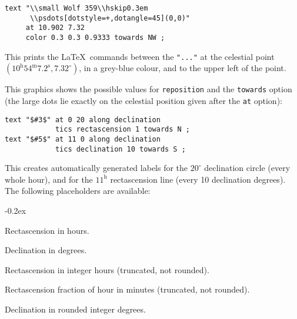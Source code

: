 \documentclass{article}
\newcommand{\subsubskip}{\bigskip}
\begin{document}
\begin{multicols*}{3}
\begin{lstlisting}[showstringspaces=false]
text "\\small Wolf 359\\hskip0.3em
      \\psdots[dotstyle=+,dotangle=45](0,0)"
     at 10.902 7.32
     color 0.3 0.3 0.9333 towards NW ;
\end{lstlisting}
This prints the \LaTeX\ commands between the \verb|"..."| at the celestial
point $(10^{\mathrm h}54^{\mathrm m}7.2^{\mathrm s},7.32^\circ)$, in a
grey-blue colour, and to the upper left of the point.

This graphics shows the possible values for \lstinline{reposition} and the
\lstinline{towards} option (the large dots lie exactly on the celestial
position given after the \lstinline{at} option):\\[1.5ex]
\subsubskip

\begin{lstlisting}
text "$#3$" at 0 20 along declination
            tics rectascension 1 towards N ;
text "$#5$" at 11 0 along declination
            tics declination 10 towards S ;
\end{lstlisting}
This creates automatically generated labels for the $20^\circ$ declination
circle (every whole hour), and for the $11^{\mathrm h}$ rectascension line
(every 10 declination degrees).  The following placeholders are
available:\vspace{-1.5ex}
\begin{description}\itemsep-0.2ex
\item[\texttt{\mdseries \#1}] Rectascension in hours.
\item[\texttt{\mdseries \#2}] Declination in degrees.
\item[\texttt{\mdseries \#3}] Rectascension in integer hours (truncated, not
  rounded).
\item[\texttt{\mdseries \#4}] Rectascension fraction of hour in minutes
  (truncated, not rounded).
\item[\texttt{\mdseries \#5}] Declination in rounded integer degrees.
\end{description}\vspace{-1ex}



\end{multicols*}
\end{document}
